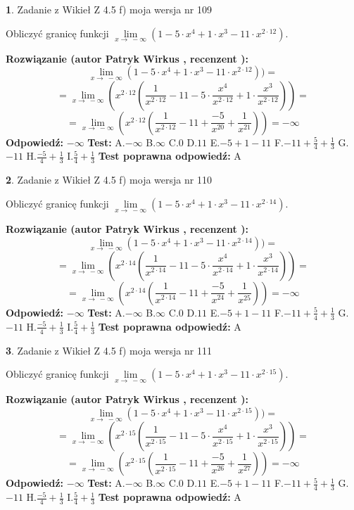 \documentclass[12pt, a4paper]{article}
\theoremstyle{definition} %
\newtheorem{zad}{}
\newcommand{\zadStart}[1]{\begin{zad}#1\newline}
\newcommand{\zadStop}{\end{zad}}
\newcommand{\rozwStart}[2]{\noindent \textbf{Rozwiązanie (autor #1 , recenzent #2): }\newline}
\newcommand{\rozwStop}{\newline}
\newcommand{\odpStart}{\noindent \textbf{Odpowiedź:}\newline}
\newcommand{\odpStop}{\newline}
\newcommand{\testStart}{\noindent \textbf{Test:}\newline}
\newcommand{\testStop}{\newline}
\newcommand{\kluczStart}{\noindent \textbf{Test poprawna odpowiedź:}\newline}
\newcommand{\kluczStop}{\newline}
\begin{document}
\zadStart{Zadanie z Wikieł Z 4.5 f) moja wersja nr 109}



Obliczyć granicę funkcji  $\lim\limits_{x\to\ -\infty}(1 - 5 \cdot x^{4}+1 \cdot x^{3}- 11 \cdot x^{2\cdot12})$.
\zadStop
\rozwStart{Patryk Wirkus}{}
$$\lim\limits_{x\to\ -\infty}(1 - 5 \cdot x^{4}+1 \cdot x^{3}- 11 \cdot x^{2\cdot12}))=$$
$$=\lim\limits_{x\to\ -\infty}(x^{2\cdot12}(\frac{1}{x^{2\cdot12}}-11 -5 \cdot \frac{x^{4}}{x^{2\cdot12}}+1 \cdot \frac{x^{3}}{x^{2\cdot12}}))=$$
$$=\lim\limits_{x\to\ -\infty}(x^{2\cdot12}(\frac{1}{x^{2\cdot12}}-11 + \frac{-5}{x^{20}}+ \frac{1}{x^{21}}))=-\infty$$
\rozwStop
\odpStart
$-\infty$
\odpStop
\testStart
A.$-\infty$ B.$\infty$ C.$0$ D.$11$ E.$-5 + 1 - 11$
F.$-11+\frac{5}{4}+\frac{1}{3}$ G.$-11$
H.$\frac{-5}{4}+\frac{1}{3}$
I.$\frac{5}{4}+\frac{1}{3}$
\testStop
\kluczStart
A
\kluczStop



\zadStart{Zadanie z Wikieł Z 4.5 f) moja wersja nr 110}



Obliczyć granicę funkcji  $\lim\limits_{x\to\ -\infty}(1 - 5 \cdot x^{4}+1 \cdot x^{3}- 11 \cdot x^{2\cdot14})$.
\zadStop
\rozwStart{Patryk Wirkus}{}
$$\lim\limits_{x\to\ -\infty}(1 - 5 \cdot x^{4}+1 \cdot x^{3}- 11 \cdot x^{2\cdot14}))=$$
$$=\lim\limits_{x\to\ -\infty}(x^{2\cdot14}(\frac{1}{x^{2\cdot14}}-11 -5 \cdot \frac{x^{4}}{x^{2\cdot14}}+1 \cdot \frac{x^{3}}{x^{2\cdot14}}))=$$
$$=\lim\limits_{x\to\ -\infty}(x^{2\cdot14}(\frac{1}{x^{2\cdot14}}-11 + \frac{-5}{x^{24}}+ \frac{1}{x^{25}}))=-\infty$$
\rozwStop
\odpStart
$-\infty$
\odpStop
\testStart
A.$-\infty$ B.$\infty$ C.$0$ D.$11$ E.$-5 + 1 - 11$
F.$-11+\frac{5}{4}+\frac{1}{3}$ G.$-11$
H.$\frac{-5}{4}+\frac{1}{3}$
I.$\frac{5}{4}+\frac{1}{3}$
\testStop
\kluczStart
A
\kluczStop



\zadStart{Zadanie z Wikieł Z 4.5 f) moja wersja nr 111}



Obliczyć granicę funkcji  $\lim\limits_{x\to\ -\infty}(1 - 5 \cdot x^{4}+1 \cdot x^{3}- 11 \cdot x^{2\cdot15})$.
\zadStop
\rozwStart{Patryk Wirkus}{}
$$\lim\limits_{x\to\ -\infty}(1 - 5 \cdot x^{4}+1 \cdot x^{3}- 11 \cdot x^{2\cdot15}))=$$
$$=\lim\limits_{x\to\ -\infty}(x^{2\cdot15}(\frac{1}{x^{2\cdot15}}-11 -5 \cdot \frac{x^{4}}{x^{2\cdot15}}+1 \cdot \frac{x^{3}}{x^{2\cdot15}}))=$$
$$=\lim\limits_{x\to\ -\infty}(x^{2\cdot15}(\frac{1}{x^{2\cdot15}}-11 + \frac{-5}{x^{26}}+ \frac{1}{x^{27}}))=-\infty$$
\rozwStop
\odpStart
$-\infty$
\odpStop
\testStart
A.$-\infty$ B.$\infty$ C.$0$ D.$11$ E.$-5 + 1 - 11$
F.$-11+\frac{5}{4}+\frac{1}{3}$ G.$-11$
H.$\frac{-5}{4}+\frac{1}{3}$
I.$\frac{5}{4}+\frac{1}{3}$
\testStop
\kluczStart
A
\kluczStop
\end{document}
